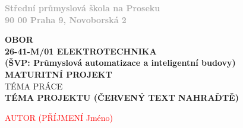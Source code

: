 \documentclass[12pt]{article} %
\begin{document}
\begin{titlepage}
\begin{minipage}{0.20\textwidth}
\end{minipage}
\begin{adjustbox}{minipage=0.6\textwidth,left}
	\textbf{\textcolor{darkgray}{
	Střední průmyslová škola na Proseku\\
	90 00 Praha 9, Novoborská 2}}
\end{adjustbox}\\[1cm]

\center

\textbf{\large OBOR}\\[0.5cm]

\textbf{\large	26-41-M/01 ELEKTROTECHNIKA\\
				(ŠVP: Průmyslová automatizace a inteligentní budovy)}\\[1cm]

\textbf{\LARGE MATURITNÍ PROJEKT}\\[1.5cm]

\textsc{TÉMA PRÁCE}\\[1.5cm]

\textbf{\color{red} \huge \bfseries  TÉMA PROJEKTU (ČERVENÝ TEXT NAHRAĎTĚ)} %


\vspace*{\fill}

\begin{minipage}{0.4\textwidth}
\begin{flushleft} \large
\the\year %
\end{flushleft}
\end{minipage}
\begin{minipage}{0.4\textwidth}
\begin{flushright}
\textcolor{red}{\large AUTOR (PŘÍJMENÍ Jméno)}
\end{flushright}
\end{minipage}

\end{titlepage}


\tableofcontents %

\newpage %

\end{document}
